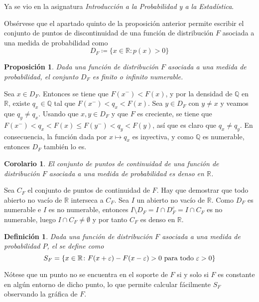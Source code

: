 \documentclass[11pt]{report}
\makeatletter
\renewenvironment{proof}[1][\proofname]{\par
  \pushQED{\qed}%
  \normalfont \topsep\z@skip %
  \trivlist
  \item[\hskip\labelsep
        \itshape
    #1\@addpunct{.}]\ignorespaces
}{%
  \popQED\endtrivlist\@endpefalse
}
\theoremstyle{mytheorem}
\newtheorem{proposition}{Proposición}
\newtheorem{corollary}{Corolario} %
\theoremstyle{mydefinition}
\newtheorem{definition}{Definición}
\theoremstyle{myexample}
\let\oldproofname=\proofname
\renewcommand{\proofname}{\rm\bf{\oldproofname}}}
\newenvironment{cdefinition} %
  {\begin{mdframed}[
        linewidth=3pt,
        linecolor=c1,
        bottomline=false,
        topline=false,
        rightline=false,
        innerrightmargin=0pt,
        innertopmargin=0pt,
        innerbottommargin=0pt,
        innerleftmargin=1em,
        skipabove=\baselineskip]
    \begin{definition}}
  {\end{definition}\end{mdframed}}
\newenvironment{cproposition} %
  {\begin{mdframed}[
        linewidth=3pt,
        linecolor=c2,
        bottomline=false,
        topline=false,
        rightline=false,
        innerrightmargin=0pt,
        innertopmargin=0pt,
        innerbottommargin=0pt,
        innerleftmargin=1em,
        skipabove=\baselineskip]
    \begin{proposition}}
  {\end{proposition}\end{mdframed}}
\newenvironment{ccorollary} %
  {\begin{mdframed}[
        linewidth=3pt,
        linecolor=c2,
        bottomline=false,
        topline=false,
        rightline=false,
        innerrightmargin=0pt,
        innertopmargin=0pt,
        innerbottommargin=0pt,
        innerleftmargin=1em,
        skipabove=\baselineskip]
    \begin{corollary}}
  {\end{corollary}\end{mdframed}}
\newcommand{\R}{\mathbb R}
\newcommand{\Q}{\mathbb Q}
\newcommand{\mybf}[1]{\boldmath\textbf{\color{c1}#1}\unboldmath} %
\makeatother
\begin{document}
\begin{proof}
Ya se vio en la asignatura \textit{Introducción a la Probabilidad y a la Estadística}.
\end{proof}

Obsérvese que el apartado quinto de la proposición anterior permite escribir el conjunto de puntos de discontinuidad de una función de distribución $F$ asociada a una medida de probabilidad como \[D_F \coloneqq \{x \in \R \colon p(x) >0\}\]

\begin{cproposition}
Dada una función de distribución $F$ asociada a una medida de probabilidad, el conjunto $D_F$ es finito o infinito numerable.
\end{cproposition}

\begin{proof}
Sea $x \in D_F$. Entonces se tiene que $F(x^-) < F(x)$, y por la densidad de $\Q$ en $\R$, existe $q_x \in \Q$ tal que $F(x^-) < q_x < F(x)$. Sea $y \in D_F$ con $y \neq x$ y veamos que $q_y \neq q_x$. Usando que $x,y \in D_F$ y que $F$ es creciente, se tiene que $F(x^-) < q_x < F(x) \leq F(y^-) < q_y < F(y)$, así que es claro que $q_x \neq q_y$. En consecuencia, la función dada por $x \mapsto q_x$ es inyectiva, y como $\Q$ es numerable, entonces $D_F$ también lo es.
\end{proof}

\begin{ccorollary}
El conjunto de puntos de continuidad de una función de distribución $F$ asociada a una medida de probabilidad es denso en $\R$.
\end{ccorollary}

\begin{proof}
Sea $C_F$ el conjunto de puntos de continuidad de $F$. Hay que demostrar que todo abierto no vacío de $\R$ interseca a $C_F$. Sea $I$ un abierto no vacío de $\R$. Como $D_F$ es numerable e $I$ es no numerable, entonces $I \setminus D_F = I \cap D_F^c = I \cap C_F$ es no numerable, luego $I \cap C_F \neq \emptyset$ y por tanto $C_F$ es denso en $\R$.
\end{proof}

\begin{cdefinition}
Dada una función de distribución $F$ asociada a una medida de probabilidad $P$, el \mybf{{soporte de $\bm{F}$}} se define como
\[S_F = \{x \in \R \colon F(x+\varepsilon)-F(x-\varepsilon)>0 \textup{ para todo } \varepsilon >0\}\]
\end{cdefinition}

Nótese que
un punto no se encuentra en el soporte de $F$ si y solo si $F$ es constante en algún entorno de dicho punto, lo que permite calcular fácilmente $S_F$ observando la gráfica de $F$.
\end{document}
